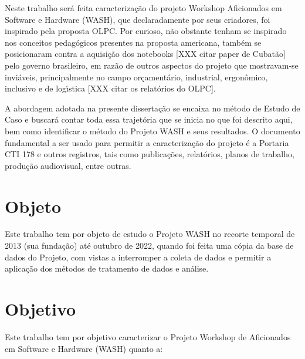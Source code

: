 \documentclass[
12pt,		%
openright,	%
twoside,  %
a4paper,			%
chapter=TITLE,		%
english,			%
french,				%
spanish,			%
brazil				%
]{USPSC-classe/USPSC_RedarTex}
\begin{document}
Neste trabalho ser\'a feita caracteriza\c{c}\~ao do projeto Workshop Aficionados em Software e Hardware (WASH), que declaradamente por seus criadores, foi inspirado pela proposta OLPC. Por curioso, n\~ao obstante tenham se inspirado nos conceitos pedag\'ogicos presentes na proposta americana, tamb\'em se posicionaram contra a aquisi\c{c}\~ao dos notebooks [XXX citar paper de Cubat\~ao] pelo governo brasileiro, em raz\~ao de outros aspectos do projeto que mostravam-se invi\'aveis, principalmente no campo or\c{c}ament\'ario, industrial, ergon\^omico, inclusivo e de log\'{\i}stica [XXX citar os relat\'orios do OLPC].








A abordagem adotada na presente disserta\c{c}\~ao se encaixa no m\'etodo de \textquotedbl Estudo de Caso e buscar\'a contar toda essa trajet\'oria que se inicia no que foi descrito aqui, bem como identificar o m\'etodo do Projeto WASH e seus resultados. O documento fundamental a ser usado para permitir a caracteriza\c{c}\~ao do projeto \'e a Portaria CTI 178 e outros registros, tais como publica\c{c}\~oes, relat\'orios, planos de trabalho, produ\c{c}\~ao audiovisual, entre outras.








\section[Objeto]{Objeto}\label{Objeto}
Este trabalho tem por objeto de estudo o  Projeto WASH no recorte temporal de 2013 (sua funda\c{c}\~ao) at\'e outubro de 2022, quando foi feita uma c\'opia da base de dados do Projeto, com vistas a interromper a coleta de dados e permitir a aplica\c{c}\~ao dos m\'etodos de tratamento de dados e an\'alise.








\section[Objetivo]{Objetivo}\label{Objetivo}
Este trabalho tem por objetivo caracterizar  o Projeto Workshop de Aficionados em Software e Hardware (WASH) quanto a:
\end{document}
